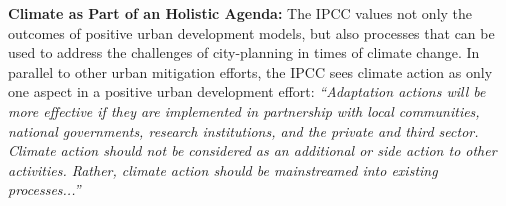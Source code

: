 {{{            \newline
            \textbf{Climate as Part of an Holistic Agenda:} The IPCC values not only the outcomes of positive urban development models, but also processes that can be used to address the challenges of city-planning in times of climate change. In parallel to other urban mitigation efforts\cite{habitat2016new, Klopp2017}, the IPCC sees climate action as only one aspect in a positive urban development effort: \textit{``Adaptation actions will be more effective if they are implemented in partnership with local communities, national governments, research institutions, and the private and third sector. Climate action should not be considered as an additional or side action to other activities. Rather, climate action should be mainstreamed into existing processes...''}\cite{IPCC_AR6_22}
        }

}}
